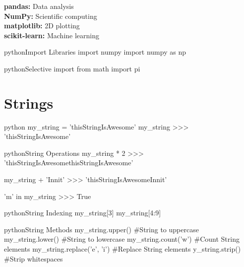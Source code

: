 \begin{myblock}{}
\textbf{pandas:} Data analysis\\
\textbf{NumPy:} Scientific computing\\
\textbf{matplotlib:} 2D plotting\\
\textbf{scikit-learn:} Machine learning\\

\end{myblock}

\begin{codebox}{python}{Import Libraries}
import numpy
import numpy as np
\end{codebox}

\begin{codebox}{python}{Selective import}
from math import pi
\end{codebox}


\section{Strings}

\begin{myblock}{}
\begin{codebox}{python}{}
my_string = 'thisStringIsAwesome'
my_string
>>> 'thisStringIsAwesome'
\end{codebox}

\begin{codebox}{python}{String Operations}
my_string * 2
>>> 'thisStringIsAwesomethisStringIsAwesome'

my_string + 'Innit'
>>> 'thisStringIsAwesomeInnit'

'm' in my_string
>>> True
\end{codebox}

\begin{codebox}{python}{String Indexing}
my_string[3]
my_string[4:9]
\end{codebox}

\begin{codebox}{python}{String Methods}
my_string.upper()  #String to uppercase
my_string.lower()  #String to lowercase
my_string.count('w')  #Count String elements
my_string.replace('e', 'i') #Replace String elements
y_string.strip()  #Strip whitespaces
\end{codebox}
\end{myblock}

